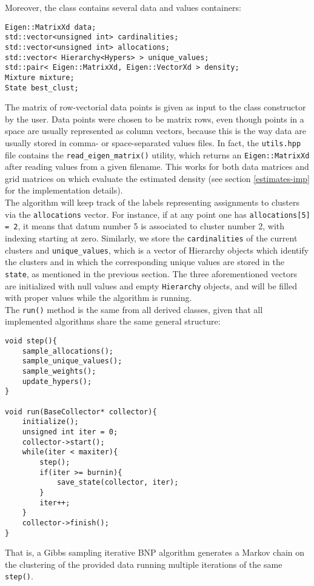 Moreover, the class contains several data and values containers:
\begin{verbatim}
Eigen::MatrixXd data;
std::vector<unsigned int> cardinalities;
std::vector<unsigned int> allocations;
std::vector< Hierarchy<Hypers> > unique_values;
std::pair< Eigen::MatrixXd, Eigen::VectorXd > density;
Mixture mixture;
State best_clust;
\end{verbatim}
The matrix of row-vectorial data points is given as input to the class constructor by the user.
Data points were chosen to be matrix rows, even though points in a space are usually represented as column vectors, because this is the way data are usually stored in comma- or space-separated values files.
In fact, the \verb|utils.hpp| file contains the \verb|read_eigen_matrix()| utility, which returns an \verb|Eigen::MatrixXd| after reading values from a given filename.
This works for both data matrices and grid matrices on which evaluate the estimated density (see section \ref{estimates-imp} for the implementation details). \\
The algorithm will keep track of the labels representing assignments to clusters via the \verb|allocations| vector.
For instance, if at any point one has \verb|allocations[5] = 2|, it means that datum number 5 is associated to cluster number 2, with indexing starting at zero.
Similarly, we store the \verb|cardinalities| of the current clusters and \verb|unique_values|, which is a vector of Hierarchy objects which identify the clusters and in which the corresponding unique values are stored in the \verb|state|, as mentioned in the previous section.
The three aforementioned vectors are initialized with null values and empty \verb|Hierarchy| objects, and will be filled with proper values while the algorithm is running. \\
The \verb|run()| method is the same from all derived classes, given that all implemented algorithms share the same general structure:
\begin{verbatim}
void step(){
    sample_allocations();
    sample_unique_values();
    sample_weights();
    update_hypers();
}

void run(BaseCollector* collector){
    initialize();
    unsigned int iter = 0;
    collector->start();
    while(iter < maxiter){
        step();
        if(iter >= burnin){
            save_state(collector, iter);
        }
        iter++;
    }
    collector->finish();
}    
\end{verbatim}
That is, a Gibbs sampling iterative BNP algorithm generates a Markov chain on the clustering of the provided data running multiple iterations of the same \verb|step()|.
